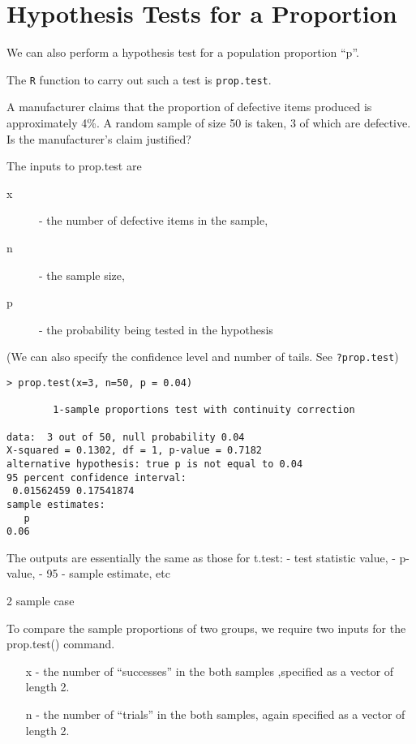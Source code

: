 \newpage

\section{Hypothesis Tests for a Proportion}

We can also perform a hypothesis test for a population proportion “p”. 

The \texttt{R} function to carry out such a test is \texttt{prop.test}.

A manufacturer claims that the proportion of defective items produced is approximately 4\%. 
A random sample of size 50 is taken, 3 of which are defective. Is the manufacturer's claim justified?

The inputs to prop.test are 
\begin{description}
\item[x] - the number of defective items in the sample, 
\item[n] - the sample size, 
\item[p] - the probability being tested in the hypothesis	
\end{description}

(We can also specify the confidence  level and number of tails. See \texttt{?prop.test})
 
\begin{framed}
\begin{verbatim}
> prop.test(x=3, n=50, p = 0.04)

        1-sample proportions test with continuity correction

data:  3 out of 50, null probability 0.04 
X-squared = 0.1302, df = 1, p-value = 0.7182
alternative hypothesis: true p is not equal to 0.04 
95 percent confidence interval:
 0.01562459 0.17541874 
sample estimates:
   p 
0.06 
\end{verbatim}
\end{framed}
The outputs are essentially the same as those for t.test:
- test statistic value,
- p-value,
- 95%
- sample estimate, etc

2 sample case

To compare the sample proportions of two groups, we require two inputs for the prop.test() command.

\begin{itemize}
\item[x] - the number of “successes” in the both samples ,specified as a vector of length 2.
\item[n] - the number of “trials” in the both samples, again specified as a vector of length 2.
\end{itemize}

